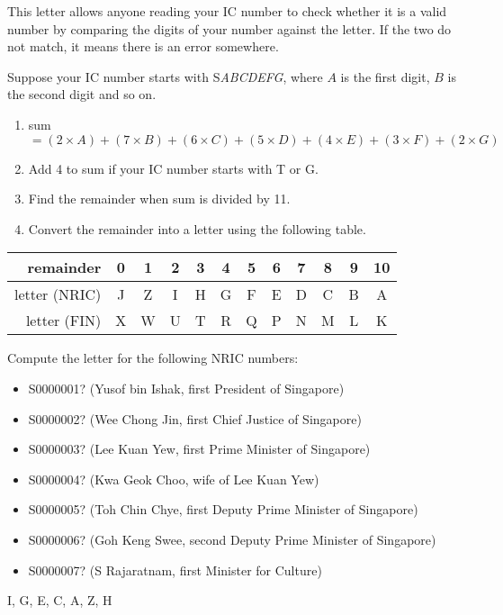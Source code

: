 \documentclass[a4paper,12pt]{article}
\begin{document}
This letter allows anyone reading your IC number to check
whether it is a valid number by comparing the digits of your number against the
letter. If the two do not match, it means there is an error somewhere.

Suppose your IC number starts with S\emph{ABCDEFG}, where $A$ is the first
digit, $B$ is the second digit and so on.
\begin{enumerate}
    \item sum $= (2 \times A) +
                 (7 \times B) +
                 (6 \times C) +
                 (5 \times D) +
                 (4 \times E) +
                 (3 \times F) +
                 (2 \times G)$
    \item Add 4 to sum if your IC number starts with T or G.
    \item Find the remainder when sum is divided by 11.
    \item Convert the remainder into a letter using the following table.
\end{enumerate}

\begin{tabular}{r||ccccccccccc}
    remainder     & 0 & 1 & 2 & 3 & 4 & 5 & 6 & 7 & 8 & 9 & 10 \\ \hline
    letter (NRIC) & J & Z & I & H & G & F & E & D & C & B & A  \\
    letter (FIN)  & X & W & U & T & R & Q & P & N & M & L & K
\end{tabular}


\begin{question}[skip-below=0\baselineskip]
Compute the letter for the following NRIC numbers:
\begin{itemize}
    \item S0000001? (Yusof bin Ishak, first President of Singapore)
    \item S0000002? (Wee Chong Jin, first Chief Justice of Singapore)
    \item S0000003? (Lee Kuan Yew, first Prime Minister of Singapore)
    \item S0000004? (Kwa Geok Choo, wife of Lee Kuan Yew)
    \item S0000005? (Toh Chin Chye, first Deputy Prime Minister of Singapore)
    \item S0000006? (Goh Keng Swee, second Deputy Prime Minister of Singapore)
    \item S0000007? (S Rajaratnam, first Minister for Culture)
\end{itemize}
\end{question}
\begin{solution}
I, G, E, C, A, Z, H
\end{solution}
\end{document}

